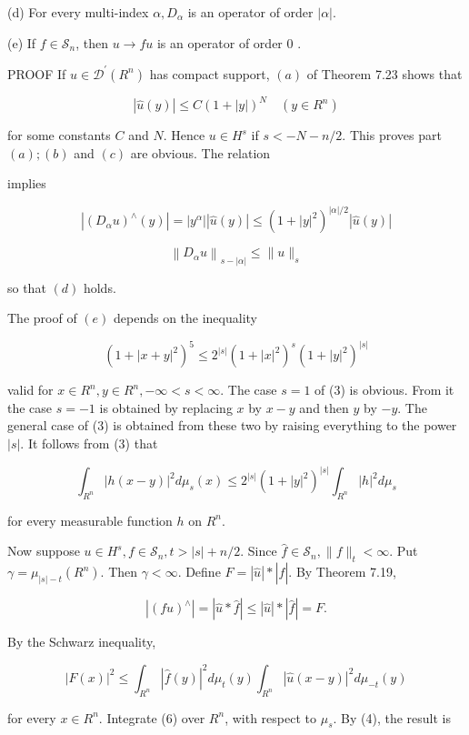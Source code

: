 \documentclass[10pt]{article}
\begin{document}
(d) For every multi-index $\alpha, D_{\alpha}$ is an operator of order $|\alpha|$.

(e) If $f \in \mathscr{S}_{n}$, then $u \rightarrow f u$ is an operator of order 0 .

PROOF If $u \in \mathscr{D}^{\prime}\left(R^{n}\right)$ has compact support, $(a)$ of Theorem 7.23 shows that

$$
|\hat{u}(y)| \leq C(1+|y|)^{N} \quad\left(y \in R^{n}\right)
$$

for some constants $C$ and $N$. Hence $u \in H^{s}$ if $s<-N-n / 2$. This proves part $(a) ;(b)$ and $(c)$ are obvious. The relation

implies

$$
\left|\left(D_{\alpha} u\right)^{\wedge}(y)\right|=\left|y^{\alpha}\right||\hat{u}(y)| \leq\left(1+|y|^{2}\right)^{|\alpha| / 2}|\hat{u}(y)|
$$

$$
\left\|D_{\alpha} u\right\|_{s-|\alpha|} \leq\|u\|_{s}
$$

so that $(d)$ holds.

The proof of $(e)$ depends on the inequality

$$
\left(1+|x+y|^{2}\right)^{5} \leq 2^{|s|}\left(1+|x|^{2}\right)^{s}\left(1+|y|^{2}\right)^{|s|}
$$

valid for $x \in R^{n}, y \in R^{n},-\infty<s<\infty$. The case $s=1$ of (3) is obvious. From it the case $s=-1$ is obtained by replacing $x$ by $x-y$ and then $y$ by $-y$. The general case of (3) is obtained from these two by raising everything to the power $|s|$. It follows from (3) that

$$
\int_{R^{n}}|h(x-y)|^{2} d \mu_{s}(x) \leq 2^{|s|}\left(1+|y|^{2}\right)^{|s|} \int_{R^{n}}|h|^{2} d \mu_{s}
$$

for every measurable function $h$ on $R^{n}$.

Now suppose $u \in H^{s}, f \in \mathscr{S}_{n}, t>|s|+n / 2$. Since $\hat{f} \in \mathscr{S}_{n},\|f\|_{t}<\infty$. Put $\gamma=\mu_{|s|-t}\left(R^{n}\right)$. Then $\gamma<\infty$. Define $F=|\hat{u}| *|\hat{f}|$. By Theorem 7.19,

$$
\left|(f u)^{\wedge}\right|=|\hat{u} * \hat{f}| \leq|\hat{u}| *|\hat{f}|=F .
$$

By the Schwarz inequality,

$$
|F(x)|^{2} \leq \int_{R^{n}}|\hat{f}(y)|^{2} d \mu_{t}(y) \int_{R^{n}}|\hat{u}(x-y)|^{2} d \mu_{-t}(y)
$$

for every $x \in R^{n}$. Integrate (6) over $R^{n}$, with respect to $\mu_{s}$. By (4), the result is
\end{document}
